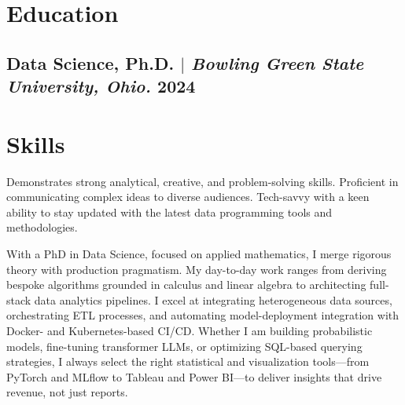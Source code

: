 \documentclass[11pt]{article}
\begin{document}
\section{Education}
\subsection{Data Science, Ph.D. $|$ {\normalfont\itshape Bowling Green State University, Ohio. } \hfill 2024} 
\vspace{1em}

\section{Skills}
Demonstrates strong analytical, creative, and problem-solving skills. Proficient in communicating complex ideas to diverse audiences. Tech-savvy with a keen ability to stay updated with the latest data programming tools and methodologies.

With a PhD in Data Science, focused on applied mathematics, I merge rigorous theory with production pragmatism. My day-to-day work ranges from deriving bespoke algorithms grounded in calculus and linear algebra to architecting full-stack data analytics pipelines. I excel at integrating heterogeneous data sources, orchestrating ETL processes, and automating model-deployment integration with Docker- and Kubernetes-based CI/CD. Whether I am building probabilistic models, fine-tuning transformer LLMs, or optimizing SQL-based querying strategies, I always select the right statistical and visualization tools—from PyTorch and MLflow to Tableau and Power BI—to deliver insights that drive revenue, not just reports.
\end{document}
